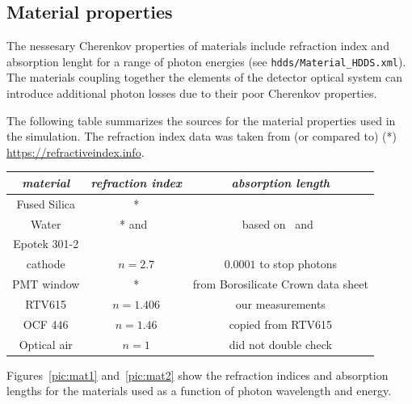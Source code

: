 \subsection{Material properties}

The nessesary Cherenkov properties of materials include refraction index and absorption lenght for a range of photon energies (see \texttt{hdds/Material{\_}HDDS.xml}). The materials coupling together the elements of the detector optical system can introduce additional photon losses due to their poor Cherenkov properties. 

The following table summarizes the sources for the material properties used in the simulation. The refraction index data was taken from (or compared to) (*) \\ \url{https://refractiveindex.info}. 

\vspace{0.5cm}
\begin{tabular}{| c | c | c |}
\hline
\textit{material} & \textit{refraction index} & \textit{absorption length} \\
\hline
Fused Silica & * & \cite{Epotek} \\
\hline
Water & * and~\cite{EpotekData} & based on~\cite{water} and~\cite{water2} \\
\hline
Epotek 301-2 & \cite{EpotekData} & \cite{Epotek} \\
\hline
cathode & $n = 2.7$ & $0.0001$ to stop photons \\
\hline
PMT window & * &  from Borosilicate Crown data sheet \\
\hline
RTV615 & $n = 1.406$ & our measurements \\
\hline
OCF 446 & $n = 1.46$ & copied from RTV615 \\
\hline
Optical air & $n = 1$ & did not double check \\
\hline
\end{tabular}
\vspace{0.5cm}

Figures~\ref{pic:mat1} and~\ref{pic:mat2} show the refraction indices and absorption lengths for the materials used as a function of photon wavelength and energy.

